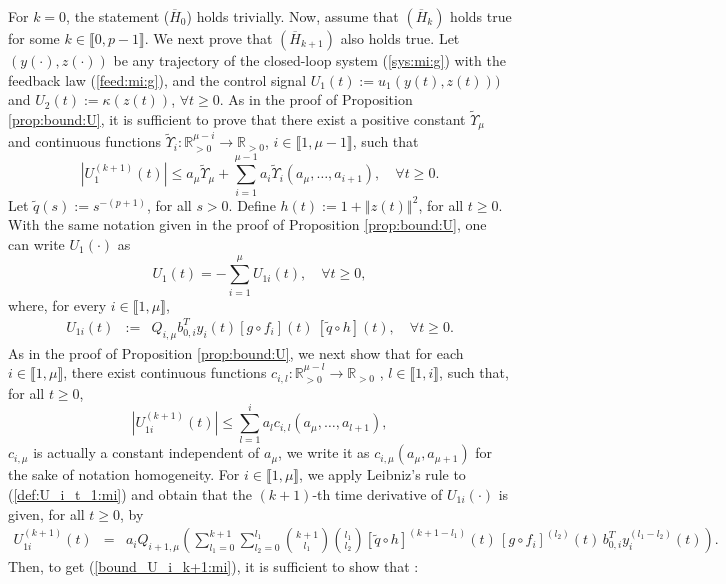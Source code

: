 \documentclass[letterpaper, 10pt]{article}
\newcommand{\rref}[1]{(\ref{#1})}
\newcommand{\norme}[1]{\left\Vert #1\right\Vert}
\newcommand{\abs}[1]{\left| #1 \right|}
\newcommand{\reels}{\mathbb{R}}
\begin{document}
For $k=0$, the statement ($\overline{H}_0$) holds trivially. Now, assume that $(\overline{H}_k)$ holds true for some $k \in \llbracket 0, p-1 \rrbracket$. We next prove that $(\overline{H}_{k+1})$ also holds true. Let $(y(\cdot),z(\cdot))$ be any trajectory of the closed-loop system \rref{sys:mi:g} with the feedback law \rref{feed:mi:g}, and the control signal $U_1(t):= u_1 (y(t),z(t)))$ and $U_2(t):= \kappa(z(t))$, $\forall t \geq 0 $. As in the proof of Proposition \ref{prop:bound:U}, it is sufficient to prove that there exist a positive constant $\tilde{\Upsilon}_\mu$ and continuous functions $\tilde{\Upsilon}_i : \reels^{\mu -i}_{>0 } \to \reels_{>0} $, $i \in \llbracket 1 , \mu -1 \rrbracket$, such that
\begin{equation}
\label{fedbound:ind:H:k+1}
\abs{U_1^{(k+1)}(t)} \leq a_\mu \tilde{\Upsilon}_\mu + \sum\limits_{i=1}^{ \mu - 1 } a_i \tilde{\Upsilon}_i( a_\mu , \ldots , a_{i+1} ),\quad \forall t\geq 0.
\end{equation}Let $\tilde{q}(s):= s^{-(p+1)}$, for all $s>0$. Define $h(t):= 1 + \norme{z(t)}^2$, for all $t \geq 0$. With the same notation given in the proof of Proposition \ref{prop:bound:U}, one can write $U_1(\cdot)$ as
\begin{equation}
\label{def:U_t:mi}
U_1(t) = -  \sum\limits_{i=1}^{\mu} U_{1i}(t), \quad \forall t \geq 0,
\end{equation}
where, for every $i \in \llbracket 1 , \mu \rrbracket $,
\begin{eqnarray}
\label{def:U_i_t_1:mi}
U_{1i}(t) & := & Q_{i,\mu}  b_{0,i}^T y_i(t) [g\circ f_i](t) \:  [\tilde{q} \circ h](t), \quad \forall t \geq 0. 
\end{eqnarray} 
As in the proof of Proposition \ref{prop:bound:U}, we next show that  for each $i \in \llbracket 1 , \mu \rrbracket$, there exist continuous functions $c_{i,l} : \reels^{\mu -l}_{>0 } \to \reels_{>0} $ , $l \in \llbracket 1 , i \rrbracket$, such that, for all $t \geq 0$,
\begin{equation}
\label{bound_U_i_k+1:mi}
\abs{U_{1i}^{(k+1)}(t) } \leq  \sum\limits_{l=1 }^{i} a_l c_{i,l}(a_\mu , \ldots , a_{l+1}),
\end{equation}
$c_{i,\mu}$ is actually a constant independent of $a_\mu$, we write it as $c_{i , \mu} (a_{\mu},a_{\mu+1}) $ for the sake of notation homogeneity. For $i \in \llbracket 1 , \mu \rrbracket $, we apply Leibniz's rule to \rref{def:U_i_t_1:mi} and obtain that the $(k+1)$-th time derivative of $U_{1i}(\cdot)$ is given, for all $t \geq 0$, by 
\begin{eqnarray*}
U_{1i}^{(k+1)}(t) & = & a_i Q_{i+1,\mu} \left(   \sum\limits_{l_1 = 0}^{k+1 } \sum\limits_{l_2 = 0}^{l_1 } \binom{k+1}{l_1} \binom{l_1}{l_2}[\tilde{q} \circ h]^{(k+1-l_1)}(t) \,   [g\circ f_i]^{(l_2)}(t) \, b_{0,i}^T y_i^{(l_1-l_2)}(t) \right).
\end{eqnarray*} Then, to get \rref{bound_U_i_k+1:mi}, it is sufficient to show that :
\end{document}
